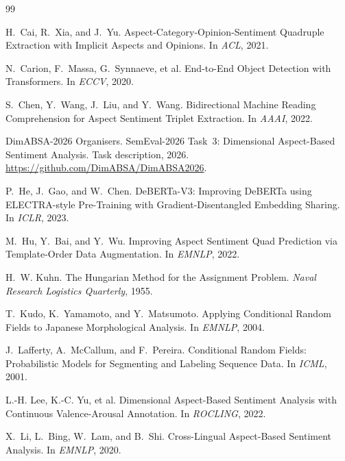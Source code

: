 \documentclass[11pt]{article}
\begin{document}
\begin{thebibliography}{99}\small

H.~Cai, R.~Xia, and J.~Yu.
\newblock Aspect-Category-Opinion-Sentiment Quadruple Extraction with
Implicit Aspects and Opinions.
\newblock In \emph{ACL}, 2021.

N.~Carion, F.~Massa, G.~Synnaeve, et al.
\newblock End-to-End Object Detection with Transformers.
\newblock In \emph{ECCV}, 2020.

S.~Chen, Y.~Wang, J.~Liu, and Y.~Wang.
\newblock Bidirectional Machine Reading Comprehension for Aspect
Sentiment Triplet Extraction.
\newblock In \emph{AAAI}, 2022.

DimABSA-2026 Organisers.
\newblock SemEval-2026 Task~3: Dimensional Aspect-Based Sentiment
Analysis.
\newblock Task description, 2026. \url{https://github.com/DimABSA/DimABSA2026}.

P.~He, J.~Gao, and W.~Chen.
\newblock DeBERTa-V3: Improving DeBERTa using ELECTRA-style
Pre-Training with Gradient-Disentangled Embedding Sharing.
\newblock In \emph{ICLR}, 2023.

M.~Hu, Y.~Bai, and Y.~Wu.
\newblock Improving Aspect Sentiment Quad Prediction via
Template-Order Data Augmentation.
\newblock In \emph{EMNLP}, 2022.

H.~W. Kuhn.
\newblock The Hungarian Method for the Assignment Problem.
\newblock \emph{Naval Research Logistics Quarterly}, 1955.

T.~Kudo, K.~Yamamoto, and Y.~Matsumoto.
\newblock Applying Conditional Random Fields to Japanese
Morphological Analysis.
\newblock In \emph{EMNLP}, 2004.

J.~Lafferty, A.~McCallum, and F.~Pereira.
\newblock Conditional Random Fields: Probabilistic Models for
Segmenting and Labeling Sequence Data.
\newblock In \emph{ICML}, 2001.

L.-H. Lee, K.-C. Yu, et al.
\newblock Dimensional Aspect-Based Sentiment Analysis with
Continuous Valence-Arousal Annotation.
\newblock In \emph{ROCLING}, 2022.

X.~Li, L.~Bing, W.~Lam, and B.~Shi.
\newblock Cross-Lingual Aspect-Based Sentiment Analysis.
\newblock In \emph{EMNLP}, 2020.


\end{thebibliography}
\end{document}
